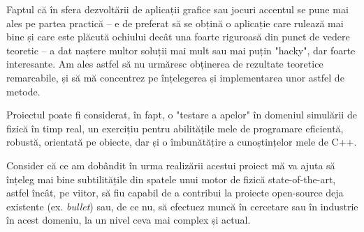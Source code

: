 \documentclass[12pt,a4paper]{report}
\newcommand{\worktype}[1]{[\textit{#1}] }
\newcommand{\dezvoltare}{\worktype{Dezvoltare de produs}}
\newcommand{\cercetare}{\worktype{Cercetare}}
\begin{document}
Faptul că în sfera dezvoltării de aplicații grafice sau jocuri accentul se pune mai ales pe partea practică -- e de preferat să se obțină o aplicație care rulează mai bine și care este plăcută ochiului decât una foarte riguroasă din punct de vedere teoretic -- a dat naștere multor soluții mai mult sau mai puțin "hacky", dar foarte interesante. Am ales astfel să nu urmăresc obținerea de rezultate teoretice remarcabile, și să mă concentrez pe înțelegerea și implementarea unor astfel de metode.

Proiectul poate fi considerat, în fapt, o "testare a apelor" în domeniul simulării de fizică în timp real, un exercițiu pentru abilitățile mele de programare eficientă, robustă, orientată pe obiecte, dar și o îmbunătățire a cunoștințelor mele de C++.

Consider că ce am dobândit în urma realizării acestui proiect mă va ajuta să înțeleg mai bine subtilitățile din spatele unui motor de fizică state-of-the-art, astfel încât, pe viitor, să fiu capabil de a contribui la proiecte open-source deja existente (ex. \textit{bullet}\cite{bullet}) sau, de ce nu, să efectuez muncă în cercetare sau în industrie în acest domeniu, la un nivel ceva mai complex și actual.



%
%
%
%
%
%
\end{document}
